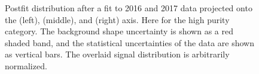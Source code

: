 \begin{figure}[h!]
\caption{Postfit distribution after a fit to 2016 and 2017 data projected onto the \MJO (left), \MJT (middle), and \MVV (right) axis. Here for the high purity category. The background shape uncertainty is shown as a red shaded band, and the statistical uncertainties of the data are shown as vertical bars. The overlaid signal distribution is arbitrarily normalized.}
\label{fig:searchIII:finalPostFitHP}
\end{figure}
\begin{figure}[h!]
\centering
{}
\\

\end{figure}
